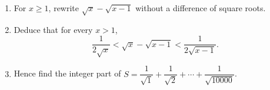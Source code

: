 \begin{enumerate}
\item[(a)] For $x\ge1$, rewrite $\sqrt x-\sqrt{x-1}$ without a difference of square roots.
\item[(b)] Deduce that for every $x>1$,
\[\dfrac{1}{2\sqrt x}<\sqrt x-\sqrt{x-1}<\dfrac{1}{2\sqrt{x-1}}.\]
\item[(c)] Hence find the integer part of $S=\dfrac{1}{\sqrt1}+\dfrac{1}{\sqrt2}+\cdots+\dfrac{1}{\sqrt{10000}}$.
\end{enumerate}
